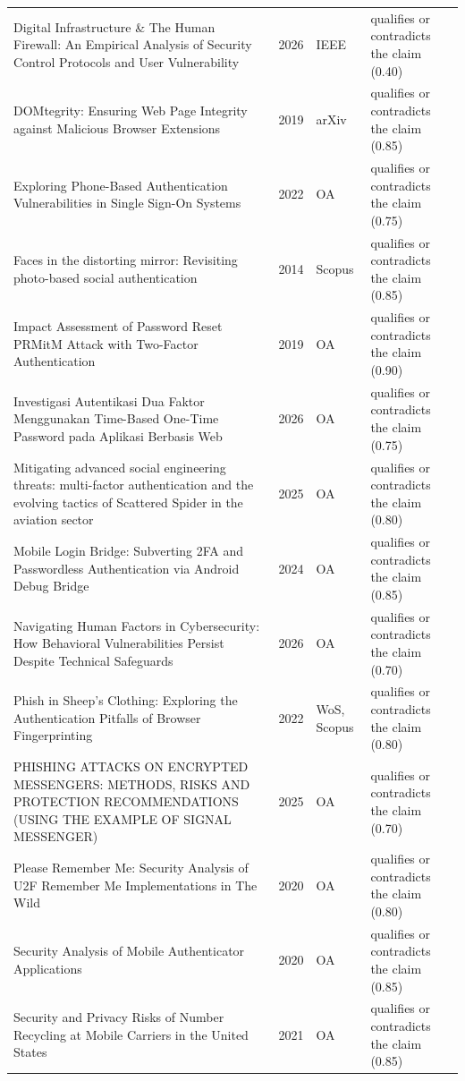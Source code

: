 \begin{longtable}{@{}%
  >{\raggedright\arraybackslash}p{}c%
  >{\raggedright\arraybackslash}p{}%
  >{\raggedright\arraybackslash}p{}@{}}
Digital Infrastructure \& The Human Firewall: An Empirical Analysis of Security Control Protocols and User Vulnerability & 2026 & IEEE & qualifies or contradicts the claim (0.40) \\
DOMtegrity: Ensuring Web Page Integrity against Malicious Browser Extensions & 2019 & arXiv & qualifies or contradicts the claim (0.85) \\
Exploring Phone-Based Authentication Vulnerabilities in Single Sign-On Systems & 2022 & OA & qualifies or contradicts the claim (0.75) \\
Faces in the distorting mirror: Revisiting photo-based social authentication & 2014 & Scopus & qualifies or contradicts the claim (0.85) \\
Impact Assessment of Password Reset PRMitM Attack with Two-Factor Authentication & 2019 & OA & qualifies or contradicts the claim (0.90) \\
Investigasi Autentikasi Dua Faktor Menggunakan Time-Based One-Time Password pada Aplikasi Berbasis Web & 2026 & OA & qualifies or contradicts the claim (0.75) \\
Mitigating advanced social engineering threats: multi-factor authentication and the evolving tactics of Scattered Spider in the aviation sector & 2025 & OA & qualifies or contradicts the claim (0.80) \\
Mobile Login Bridge: Subverting 2FA and Passwordless Authentication via Android Debug Bridge & 2024 & OA & qualifies or contradicts the claim (0.85) \\
Navigating Human Factors in Cybersecurity: How Behavioral Vulnerabilities Persist Despite Technical Safeguards & 2026 & OA & qualifies or contradicts the claim (0.70) \\
Phish in Sheep's Clothing: Exploring the Authentication Pitfalls of Browser Fingerprinting & 2022 & WoS, Scopus & qualifies or contradicts the claim (0.80) \\
PHISHING ATTACKS ON ENCRYPTED MESSENGERS: METHODS, RISKS AND PROTECTION RECOMMENDATIONS (USING THE EXAMPLE OF SIGNAL MESSENGER) & 2025 & OA & qualifies or contradicts the claim (0.70) \\
Please Remember Me: Security Analysis of U2F Remember Me Implementations in The Wild & 2020 & OA & qualifies or contradicts the claim (0.80) \\
Security Analysis of Mobile Authenticator Applications & 2020 & OA & qualifies or contradicts the claim (0.85) \\
Security and Privacy Risks of Number Recycling at Mobile Carriers in the United States & 2021 & OA & qualifies or contradicts the claim (0.85) \\

\end{longtable}
